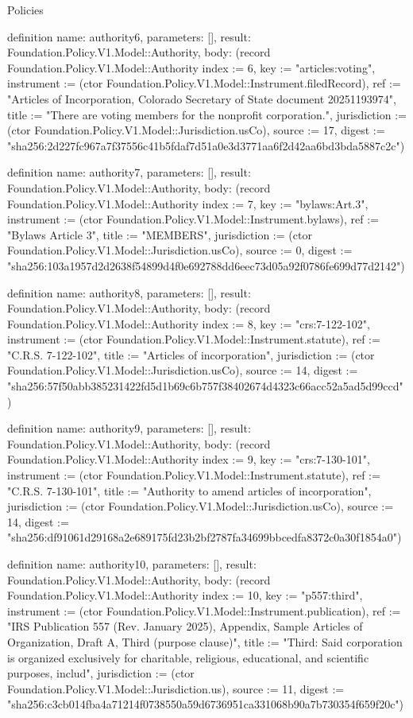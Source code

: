 \begin{lexlean}{Policies}
\begin{semanticmodule}
definition{
  name: authority6,
  parameters: [],
  result: Foundation.Policy.V1.Model::Authority,
  body: (record Foundation.Policy.V1.Model::Authority {index := 6, key := "articles:voting", instrument := (ctor Foundation.Policy.V1.Model::Instrument.filedRecord), ref := "Articles of Incorporation, Colorado Secretary of State document 20251193974", title := "There are voting members for the nonprofit corporation.", jurisdiction := (ctor Foundation.Policy.V1.Model::Jurisdiction.usCo), source := 17, digest := "sha256:2d227fc967a7f37556c41b5fdaf7d51a0e3d3771aa6f2d42aa6bd3bda5887c2c"})
}

definition{
  name: authority7,
  parameters: [],
  result: Foundation.Policy.V1.Model::Authority,
  body: (record Foundation.Policy.V1.Model::Authority {index := 7, key := "bylaws:Art.3", instrument := (ctor Foundation.Policy.V1.Model::Instrument.bylaws), ref := "Bylaws Article 3", title := "MEMBERS", jurisdiction := (ctor Foundation.Policy.V1.Model::Jurisdiction.usCo), source := 0, digest := "sha256:103a1957d2d2638f54899d4f0e692788dd6eec73d05a92f0786fe699d77d2142"})
}

definition{
  name: authority8,
  parameters: [],
  result: Foundation.Policy.V1.Model::Authority,
  body: (record Foundation.Policy.V1.Model::Authority {index := 8, key := "crs:7-122-102", instrument := (ctor Foundation.Policy.V1.Model::Instrument.statute), ref := "C.R.S. 7-122-102", title := "Articles of incorporation", jurisdiction := (ctor Foundation.Policy.V1.Model::Jurisdiction.usCo), source := 14, digest := "sha256:57f50abb385231422fd5d1b69c6b757f38402674d4323c66acc52a5ad5d99ccd"})
}

definition{
  name: authority9,
  parameters: [],
  result: Foundation.Policy.V1.Model::Authority,
  body: (record Foundation.Policy.V1.Model::Authority {index := 9, key := "crs:7-130-101", instrument := (ctor Foundation.Policy.V1.Model::Instrument.statute), ref := "C.R.S. 7-130-101", title := "Authority to amend articles of incorporation", jurisdiction := (ctor Foundation.Policy.V1.Model::Jurisdiction.usCo), source := 14, digest := "sha256:df91061d29168a2e689175fd23b2bf2787fa34699bbcedfa8372c0a30f1854a0"})
}

definition{
  name: authority10,
  parameters: [],
  result: Foundation.Policy.V1.Model::Authority,
  body: (record Foundation.Policy.V1.Model::Authority {index := 10, key := "p557:third", instrument := (ctor Foundation.Policy.V1.Model::Instrument.publication), ref := "IRS Publication 557 (Rev. January 2025), Appendix, Sample Articles of Organization, Draft A, Third (purpose clause)", title := "Third: Said corporation is organized exclusively for charitable, religious, educational, and scientific purposes, includ", jurisdiction := (ctor Foundation.Policy.V1.Model::Jurisdiction.us), source := 11, digest := "sha256:c3cb014fba4a71214f0738550a59d6736951ca331068b90a7b730354f659f20c"})
}


\end{semanticmodule}
\end{lexlean}

